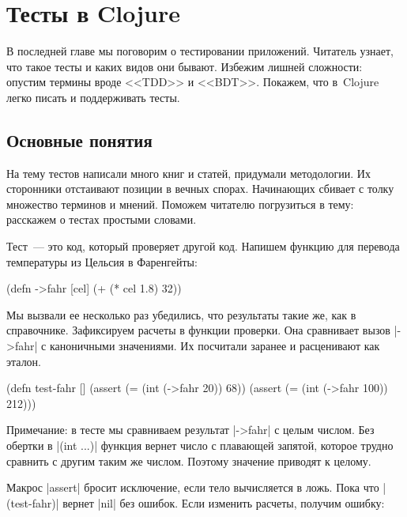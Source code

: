 \chapter{Тесты в Clojure}

\label{chapter-tests}

\begin{teaser}
В последней главе мы поговорим о тестировании приложений. Читатель узнает, что
такое тесты и каких видов они бывают. Избежим лишней сложности: опустим термины
вроде <<TDD>> и <<BDT>>. Покажем, что в~Clojure легко писать и поддерживать
тесты.
\end{teaser}

\section{Основные понятия}

На тему тестов написали много книг и статей, придумали методологии. Их
сторонники отстаивают позиции в вечных спорах. Начинающих сбивает с толку
множество терминов и мнений. Поможем читателю погрузиться в тему: расскажем о
тестах простыми словами.

Тест~--- это код, который проверяет другой код. Напишем функцию для перевода
температуры из Цельсия в Фаренгейты:

\begin{english}
  \begin{clojure}
(defn ->fahr [cel]
  (+ (* cel 1.8) 32))
  \end{clojure}
\end{english}

Мы вызвали ее несколько раз убедились, что результаты такие же, как в
справочнике. Зафиксируем расчеты в функции проверки. Она сравнивает вызов
\spverb|->fahr| с каноничными значениями. Их посчитали заранее и расценивают как
эталон.

\begin{english}
  \begin{clojure}
(defn test-fahr []
  (assert (= (int (->fahr 20)) 68))
  (assert (= (int (->fahr 100)) 212)))
  \end{clojure}
\end{english}

Примечание: в тесте мы сравниваем результат \spverb|->fahr| с целым числом. Без
обертки в \spverb|(int ...)| функция вернет число с плавающей запятой, которое
трудно сравнить с другим таким же числом. Поэтому значение приводят к целому.

Макрос \spverb|assert| бросит исключение, если тело вычисляется в ложь. Пока что
\spverb|(test-fahr)| вернет \spverb|nil| без ошибок. Если изменить расчеты,
получим ошибку:

